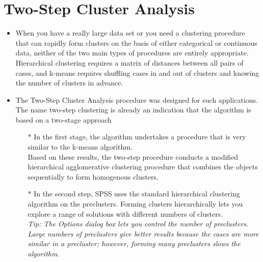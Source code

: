 \documentclass[a4paper,12pt]{article}
\begin{document}
\section{Two-Step Cluster Analysis}
\begin{itemize}
	\item 
	
	When you have a really large data set or you need a clustering procedure that can rapidly form clusters on the basis of either categorical or continuous data, neither of the two main types of procedures are entirely appropriate. Hierarchical clustering requires a matrix of distances between all pairs of cases, and k-means requires shuffling cases in and out of clusters and knowing the number of clusters in advance.
	
	\item The Two-Step Cluster Analysis procedure was designed for such applications. The name two-step clustering is already an indication that the algorithm is based on a two-stage approach
	\begin{itemize}
		\item[$\ast$] In the first stage, the algorithm undertakes a procedure that is very similar to the k-means algorithm. \\Based on these results, the two-step
		procedure conducts a modified hierarchical agglomerative clustering procedure that
		combines the objects sequentially to form homogenous clusters.

	\item[$\ast$] In the second step, SPSS uses the standard hierarchical clustering algorithm on the
	preclusters. Forming clusters hierarchically lets you explore a range of solutions with
	different numbers of clusters.
	\\ \textit{Tip: The Options dialog box lets you control the number of preclusters. Large numbers
	of preclusters give better results because the cases are more similar in a precluster;
	however, forming many preclusters slows the algorithm}.
	


\end{itemize}
\end{itemize}
\end{document}
